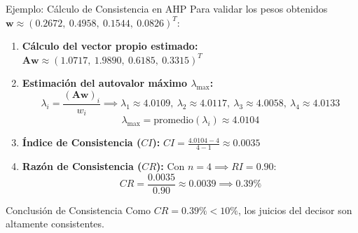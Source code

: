 \documentclass[aspectratio=169, 10pt]{beamer}
\begin{document}
\begin{frame}{Ejemplo: Cálculo de Consistencia en AHP}
    Para validar los pesos obtenidos $\mathbf{w} \approx (0.2672, \ 0.4958, \ 0.1544, \ 0.0826)^T$:
    \begin{enumerate}
        \item \textbf{Cálculo del vector propio estimado:} $\mathbf{A}\mathbf{w} \approx (1.0717, \ 1.9890, \ 0.6185, \ 0.3315)^T$
        \item \textbf{Estimación del autovalor máximo $\lambda_{\max}$:}
              \[ \lambda_i = \frac{(\mathbf{A}\mathbf{w})_i}{w_i} \implies \lambda_1 \approx 4.0109, \ \lambda_2 \approx 4.0117, \ \lambda_3 \approx 4.0058, \ \lambda_4 \approx 4.0133 \]
              \[ \lambda_{\max} = \text{promedio}(\lambda_i) \approx \mathbf{4.0104} \]
        \item \textbf{Índice de Consistencia ($CI$):} $CI = \frac{4.0104 - 4}{4 - 1} \approx \mathbf{0.0035}$
        \item \textbf{Razón de Consistencia ($CR$):} Con $n=4 \implies RI = 0.90$:
              \[ CR = \frac{0.0035}{0.90} \approx 0.0039 \implies \mathbf{0.39\%} \]
    \end{enumerate}
    \begin{alertblock}{Conclusión de Consistencia}
        Como $CR = 0.39\% < 10\%$, los juicios del decisor son altamente consistentes.
    \end{alertblock}
\end{frame}
\end{document}
